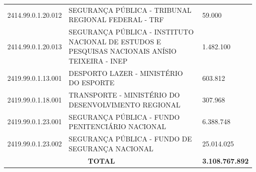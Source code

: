 \documentclass{article}
\begin{document}
\begin{longtable}[c]{m{2cm}|m{13cm}|m{2cm}}
\multicolumn{1}{C{2cm}|}{2414.99.0.1.20.012} & \multicolumn{1}{L{13cm}|}{SEGURANÇA PÚBLICA - TRIBUNAL REGIONAL FEDERAL - TRF} & \multicolumn{1}{R{2cm}}{59.000} \\
\multicolumn{1}{C{2cm}|}{2414.99.0.1.20.013} & \multicolumn{1}{L{13cm}|}{SEGURANÇA PÚBLICA - INSTITUTO NACIONAL DE ESTUDOS E PESQUISAS NACIONAIS ANÍSIO TEIXEIRA - INEP} & \multicolumn{1}{R{2cm}}{1.482.100} \\
\multicolumn{1}{C{2cm}|}{2419.99.0.1.13.001} & \multicolumn{1}{L{13cm}|}{DESPORTO LAZER - MINISTÉRIO DO ESPORTE} & \multicolumn{1}{R{2cm}}{603.812} \\
\multicolumn{1}{C{2cm}|}{2419.99.0.1.18.001} & \multicolumn{1}{L{13cm}|}{TRANSPORTE - MINISTÉRIO DO DESENVOLVIMENTO REGIONAL} & \multicolumn{1}{R{2cm}}{307.968} \\
\multicolumn{1}{C{2cm}|}{2419.99.0.1.23.001} & \multicolumn{1}{L{13cm}|}{SEGURANÇA PÚBLICA - FUNDO PENITENCIÁRIO NACIONAL} & \multicolumn{1}{R{2cm}}{6.388.748} \\
\multicolumn{1}{C{2cm}|}{2419.99.0.1.23.002} & \multicolumn{1}{L{13cm}|}{SEGURANÇA PÚBLICA - FUNDO DE SEGURANÇA NACIONAL} & \multicolumn{1}{R{2cm}}{25.014.025} \\
\hline
\multicolumn{2}{c|}{ \textbf{TOTAL}} & \multicolumn{1}{R{2cm}}{ \textbf{3.108.767.892}} \\\hline\hline\end{longtable}\raggedright\fontsize{7pt}{10pt}\selectfont {FONTE: Armazém Sisor.} \\\fontsize{7pt}{10pt}\selectfont {ELABORAÇÃO: DCAF/SCPPO/SEPLAG}\\\fontsize{7pt}{10pt}\selectfont {Nota: Na elaboração desse relatório foram consideradas as fontes de recurso 1, 2, 3, 4, 5, 6, 7, 8, 24, 36, 37, 38, 56, 57, 62, 63, 64, 65, 73, 92, 93, 96, 97 e 99.}\\
\end{document}
